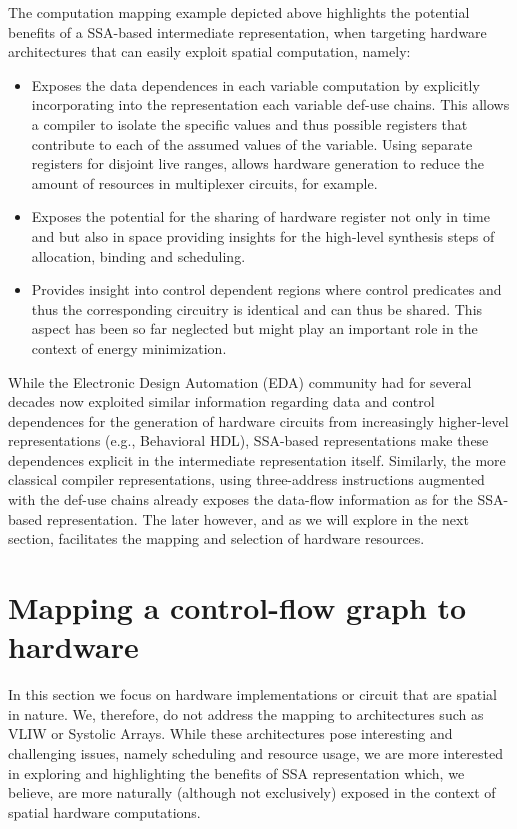 The computation mapping example depicted above highlights the potential benefits of a SSA-based intermediate representation, when targeting hardware architectures that can easily exploit spatial computation, namely:
\begin{itemize}
\item Exposes the data dependences in each variable computation by explicitly incorporating into the representation each variable def-use chains. 
  This allows a compiler to isolate the specific values and thus possible registers that contribute to each of the assumed values of the variable. 
  Using separate registers for disjoint live ranges, allows hardware generation to reduce the amount of resources in multiplexer circuits, for example.
\item Exposes the potential for the sharing of hardware register not only in time and but also in space providing insights for the high-level synthesis steps of allocation, binding and scheduling.
\item Provides insight into control dependent regions where control predicates and thus the corresponding circuitry is identical and can thus be shared. 
  This aspect has been so far neglected but might play an important role in the context of energy minimization. 
\end{itemize}

While the Electronic Design Automation (EDA) community had for several decades now exploited similar information regarding data and control dependences for the generation of hardware circuits from increasingly higher-level representations (e.g., Behavioral HDL), SSA-based representations make these dependences explicit in the intermediate representation itself.  Similarly, the more classical compiler representations, using three-address instructions augmented with the def-use chains already exposes the data-flow information as for the SSA-based representation. The later however, and as we will explore in the next section, facilitates the mapping and selection of hardware resources.


\section{Mapping a control-flow graph to hardware}
In this section we focus on hardware implementations or circuit that are spatial in nature.
We, therefore, do not address the mapping to architectures such as VLIW or Systolic Arrays. 
While these architectures pose interesting and challenging issues, namely scheduling and resource usage, we are more interested in exploring and highlighting the benefits of SSA representation which, we believe, are more naturally (although not exclusively) exposed in the context of spatial hardware computations.

